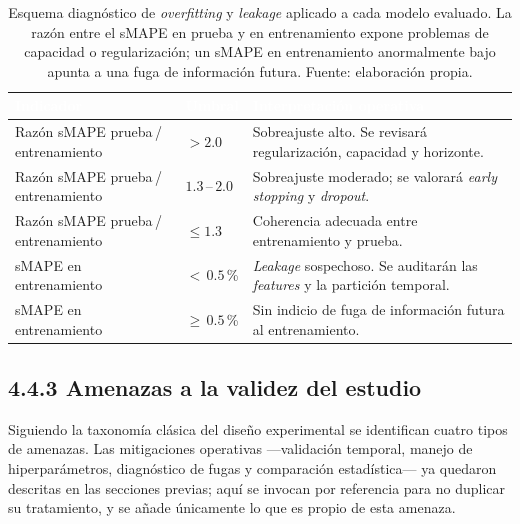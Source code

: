 \documentclass[12pt,letterpaper]{report}
\begin{document}
\begin{table}[H]
    \centering
    \footnotesize
    \setlength{\arrayrulewidth}{0.7pt}
    \setlength{\tabcolsep}{4pt}
    \begin{tabular}{>{\raggedright\arraybackslash}p{4.2cm}
                    >{\centering\arraybackslash}p{2.0cm}
                    >{\raggedright\arraybackslash}p{6.0cm}}
        \hline
        \rowcolor{uacjblue!85}
        \textcolor{white}{\textbf{Indicador}} &
        \textcolor{white}{\textbf{Umbral}} &
        \textcolor{white}{\textbf{Interpretación operativa}} \\
        \hline
        \rowcolor{uacjblue!4}
        Razón sMAPE prueba\,/\,entrenamiento & $>2.0$ & Sobreajuste alto. Se revisará regularización, capacidad y horizonte. \\
        Razón sMAPE prueba\,/\,entrenamiento & $1.3$\,--\,$2.0$ & Sobreajuste moderado; se valorará \textit{early stopping} y \textit{dropout}. \\
        \rowcolor{uacjblue!4}
        Razón sMAPE prueba\,/\,entrenamiento & $\leq 1.3$ & Coherencia adecuada entre entrenamiento y prueba. \\
        \hline
        sMAPE en entrenamiento & $<$\,$0.5$\,\% & \textit{Leakage} sospechoso. Se auditarán las \textit{features} y la partición temporal. \\
        sMAPE en entrenamiento & $\geq$\,$0.5$\,\% & Sin indicio de fuga de información futura al entrenamiento. \\
        \hline
    \end{tabular}
    \caption[Esquema diagnóstico de \textit{overfitting} y \textit{leakage}.]{Esquema diagnóstico de \textit{overfitting} y \textit{leakage} aplicado a cada modelo evaluado. La razón entre el sMAPE en prueba y en entrenamiento expone problemas de capacidad o regularización; un sMAPE en entrenamiento anormalmente bajo apunta a una fuga de información futura. Fuente: elaboración propia.}
    \label{tab:diagnostico_visapredict}
\end{table}

\subsection*{4.4.3 Amenazas a la validez del estudio}

Siguiendo la taxonomía clásica del diseño experimental se identifican cuatro tipos de amenazas. Las mitigaciones operativas ---validación temporal, manejo de hiperparámetros, diagnóstico de fugas y comparación estadística--- ya quedaron descritas en las secciones previas; aquí se invocan por referencia para no duplicar su tratamiento, y se añade únicamente lo que es propio de esta amenaza.
\end{document}
